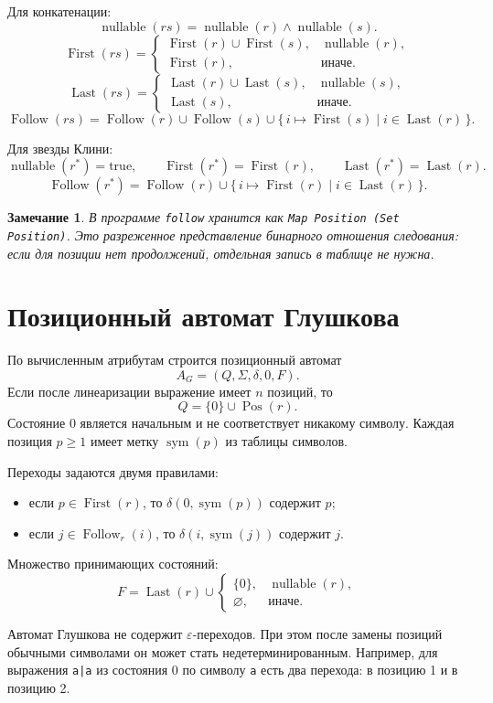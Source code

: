 \documentclass[12pt,a4paper]{article}
\newtheorem{remark}{Замечание}
\newcommand{\nullable}{\operatorname{nullable}}
\newcommand{\First}{\operatorname{First}}
\newcommand{\Last}{\operatorname{Last}}
\newcommand{\Follow}{\operatorname{Follow}}
\newcommand{\Pos}{\operatorname{Pos}}
\newcommand{\sym}{\operatorname{sym}}
\begin{document}
Для конкатенации:
\[
\nullable(rs)=\nullable(r)\land\nullable(s).
\]
\[
\First(rs)=
\begin{cases}
\First(r)\cup\First(s), & \nullable(r),\\
\First(r), & \text{иначе}.
\end{cases}
\]
\[
\Last(rs)=
\begin{cases}
\Last(r)\cup\Last(s), & \nullable(s),\\
\Last(s), & \text{иначе}.
\end{cases}
\]
\[
\Follow(rs)=\Follow(r)\cup\Follow(s)\cup
\{\, i \mapsto \First(s) \mid i\in\Last(r)\,\}.
\]

Для звезды Клини:
\[
\nullable(r^*)=\mathrm{true},
\qquad
\First(r^*)=\First(r),
\qquad
\Last(r^*)=\Last(r).
\]
\[
\Follow(r^*)=\Follow(r)\cup
\{\, i \mapsto \First(r) \mid i\in\Last(r)\,\}.
\]

\begin{remark}
В программе \verb|follow| хранится как \verb|Map Position (Set Position)|.
Это разреженное представление бинарного отношения следования: если для позиции
нет продолжений, отдельная запись в таблице не нужна.
\end{remark}

\section{Позиционный автомат Глушкова}

По вычисленным атрибутам строится позиционный автомат
\[
A_G=(Q,\Sigma,\delta,0,F).
\]
Если после линеаризации выражение имеет $n$ позиций, то
\[
Q=\{0\}\cup\Pos(r).
\]
Состояние $0$ является начальным и не соответствует никакому символу. Каждая
позиция $p\ge 1$ имеет метку $\sym(p)$ из таблицы символов.

Переходы задаются двумя правилами:
\begin{itemize}
  \item если $p\in\First(r)$, то $\delta(0,\sym(p))$ содержит $p$;
  \item если $j\in\Follow_r(i)$, то $\delta(i,\sym(j))$ содержит $j$.
\end{itemize}

Множество принимающих состояний:
\[
F=\Last(r)\cup
\begin{cases}
\{0\}, & \nullable(r),\\
\varnothing, & \text{иначе}.
\end{cases}
\]

Автомат Глушкова не содержит $\varepsilon$-переходов. При этом после замены
позиций обычными символами он может стать недетерминированным.
Например, для выражения \texttt{a|a} из состояния $0$ по символу \verb|a| есть
два перехода: в позицию 1 и в позицию 2.
\end{document}
